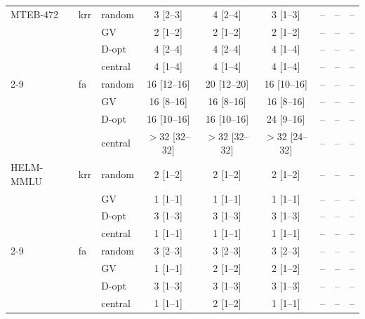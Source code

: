 \begin{tabular}{lllcccrrr}
\midrule
MTEB-472 & krr & random & 3 {\scriptsize[2--3]} & 4 {\scriptsize[2--4]} & 3 {\scriptsize[1--3]} & -- & -- & -- \\
 &  & GV & 2 {\scriptsize[1--2]} & 2 {\scriptsize[1--2]} & 2 {\scriptsize[1--2]} & -- & -- & -- \\
 &  & D-opt & 4 {\scriptsize[2--4]} & 4 {\scriptsize[2--4]} & 4 {\scriptsize[1--4]} & -- & -- & -- \\
 &  & central & 4 {\scriptsize[1--4]} & 4 {\scriptsize[1--4]} & 4 {\scriptsize[1--4]} & -- & -- & -- \\
\cmidrule(lr){2-9}
 & fa & random & 16 {\scriptsize[12--16]} & 20 {\scriptsize[12--20]} & 16 {\scriptsize[10--16]} & -- & -- & -- \\
 &  & GV & 16 {\scriptsize[8--16]} & 16 {\scriptsize[8--16]} & 16 {\scriptsize[8--16]} & -- & -- & -- \\
 &  & D-opt & 16 {\scriptsize[10--16]} & 16 {\scriptsize[10--16]} & 24 {\scriptsize[9--16]} & -- & -- & -- \\
 &  & central & $>$32 {\scriptsize[32--32]} & $>$32 {\scriptsize[32--32]} & $>$32 {\scriptsize[24--32]} & -- & -- & -- \\
\midrule
HELM-MMLU & krr & random & 2 {\scriptsize[1--2]} & 2 {\scriptsize[1--2]} & 2 {\scriptsize[1--2]} & -- & -- & -- \\
 &  & GV & 1 {\scriptsize[1--1]} & 1 {\scriptsize[1--1]} & 1 {\scriptsize[1--1]} & -- & -- & -- \\
 &  & D-opt & 3 {\scriptsize[1--3]} & 3 {\scriptsize[1--3]} & 3 {\scriptsize[1--3]} & -- & -- & -- \\
 &  & central & 1 {\scriptsize[1--1]} & 1 {\scriptsize[1--1]} & 1 {\scriptsize[1--1]} & -- & -- & -- \\
\cmidrule(lr){2-9}
 & fa & random & 3 {\scriptsize[2--3]} & 3 {\scriptsize[2--3]} & 3 {\scriptsize[2--3]} & -- & -- & -- \\
 &  & GV & 1 {\scriptsize[1--1]} & 2 {\scriptsize[1--2]} & 2 {\scriptsize[1--2]} & -- & -- & -- \\
 &  & D-opt & 3 {\scriptsize[1--3]} & 3 {\scriptsize[1--3]} & 3 {\scriptsize[1--3]} & -- & -- & -- \\
 &  & central & 1 {\scriptsize[1--1]} & 2 {\scriptsize[1--2]} & 1 {\scriptsize[1--1]} & -- & -- & -- \\
\bottomrule
\end{tabular}

